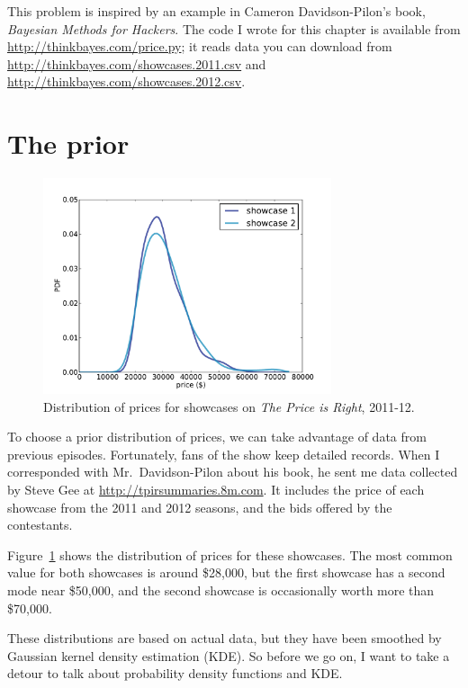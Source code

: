 \documentclass[12pt]{book}
\begin{document}
This problem is inspired by an example in Cameron Davidson-Pilon's
book, {\it Bayesian Methods for Hackers}.  The code I wrote for this
chapter is available from \url{http://thinkbayes.com/price.py}; it
reads data you can download from
\url{http://thinkbayes.com/showcases.2011.csv} and
\url{http://thinkbayes.com/showcases.2012.csv}.


\section{The prior}

\begin{figure}
\centerline{\includegraphics[height=2.5in]{figs/price1.pdf}}
\caption{Distribution of prices for showcases on
{\it The Price is Right}, 2011-12.}
\label{fig.price1}
\end{figure}

To choose a prior distribution of prices, we can take advantage
of data from previous episodes.  Fortunately, fans of the show
keep detailed records.  When I corresponded with Mr.~Davidson-Pilon
about his book, he sent me data collected by Steve Gee at
\url{http://tpirsummaries.8m.com}.  It includes the price of
each showcase from the 2011 and 2012 seasons, and the bids
offered by the contestants.

Figure~\ref{fig.price1} shows the distribution of prices for these
showcases.  The most common value for both showcases is around
\$28,000, but the first showcase has a second mode near \$50,000,
and the second showcase is occasionally worth more than \$70,000.

These distributions are based on actual data, but they
have been smoothed by Gaussian kernel density estimation (KDE).
So before we go on, I want to take a detour to talk about 
probability density functions and KDE.
\end{document}

